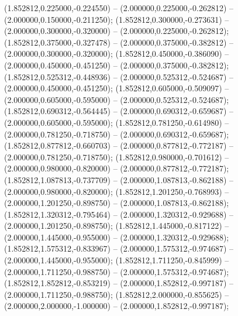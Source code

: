  (1.852812,0.225000,-0.224550) -- (2.000000,0.225000,-0.262812) -- (2.000000,0.150000,-0.211250);
 (1.852812,0.300000,-0.273631) -- (2.000000,0.300000,-0.320000) -- (2.000000,0.225000,-0.262812);
 (1.852812,0.375000,-0.327478) -- (2.000000,0.375000,-0.382812) -- (2.000000,0.300000,-0.320000);
 (1.852812,0.450000,-0.386090) -- (2.000000,0.450000,-0.451250) -- (2.000000,0.375000,-0.382812);
 (1.852812,0.525312,-0.448936) -- (2.000000,0.525312,-0.524687) -- (2.000000,0.450000,-0.451250);
 (1.852812,0.605000,-0.509097) -- (2.000000,0.605000,-0.595000) -- (2.000000,0.525312,-0.524687);
 (1.852812,0.690312,-0.564445) -- (2.000000,0.690312,-0.659687) -- (2.000000,0.605000,-0.595000);
 (1.852812,0.781250,-0.614980) -- (2.000000,0.781250,-0.718750) -- (2.000000,0.690312,-0.659687);
 (1.852812,0.877812,-0.660703) -- (2.000000,0.877812,-0.772187) -- (2.000000,0.781250,-0.718750);
 (1.852812,0.980000,-0.701612) -- (2.000000,0.980000,-0.820000) -- (2.000000,0.877812,-0.772187);
 (1.852812,1.087813,-0.737709) -- (2.000000,1.087813,-0.862188) -- (2.000000,0.980000,-0.820000);
 (1.852812,1.201250,-0.768993) -- (2.000000,1.201250,-0.898750) -- (2.000000,1.087813,-0.862188);
 (1.852812,1.320312,-0.795464) -- (2.000000,1.320312,-0.929688) -- (2.000000,1.201250,-0.898750);
 (1.852812,1.445000,-0.817122) -- (2.000000,1.445000,-0.955000) -- (2.000000,1.320312,-0.929688);
 (1.852812,1.575312,-0.833967) -- (2.000000,1.575312,-0.974687) -- (2.000000,1.445000,-0.955000);
 (1.852812,1.711250,-0.845999) -- (2.000000,1.711250,-0.988750) -- (2.000000,1.575312,-0.974687);
 (1.852812,1.852812,-0.853219) -- (2.000000,1.852812,-0.997187) -- (2.000000,1.711250,-0.988750);
 (1.852812,2.000000,-0.855625) -- (2.000000,2.000000,-1.000000) -- (2.000000,1.852812,-0.997187);

